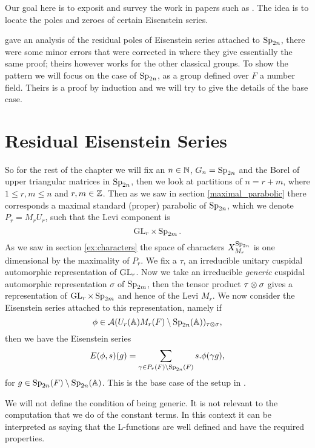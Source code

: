 \label{ch:jiang}
Our goal here is to exposit and survey the work in papers such as \cite{brennerNotesAnalyticProperties2009}\cite{jiangPolesCertainResidual2013}. The idea is to locate the poles and zeroes of certain Eisenstein series. 

\cite{brennerNotesAnalyticProperties2009} gave an analysis of the residual poles of Eisenstein series attached to \(\operatorname{Sp}_{2n}\), there were some minor errors that were corrected in \cite{jiangPolesCertainResidual2013} where they give essentially the same proof; theirs however works for the other classical groups. To show the pattern we will focus on the case of \(\operatorname{Sp}_{2n}\), as a group defined over \(F\) a number field. Theirs is a proof by induction and we will try to give the details of the base case. 

\section{Residual Eisenstein Series}
So for the rest of the chapter we will fix an \(n\in \N\), \(G_n = \operatorname{Sp}_{2n}\) and the Borel of upper triangular matrices in \(\operatorname{Sp}_{2n} \), then we look at partitions of \(n = r + m\), where \(1\leq r,m \leq n\) and \(r,m\in \Z\). Then as we saw in section \ref{maximal_parabolic} there corresponds a maximal standard (proper) parabolic of \(\operatorname{Sp}_{2n}\), which we denote \(P_r = M_rU_r\), such that the Levi component is 
\[\operatorname{GL}_r\times \operatorname{Sp}_{2m}. \]
As we saw in section \ref{ex:characters} the space of characters \(X^{\operatorname{Sp}_{2n}}_{M_r}\) is one dimensional by the maximality of \(P_r\). We fix a \(\tau\), an irreducible unitary cuspidal automorphic representation of \(\operatorname{GL}_r\). Now we take an irreducible \textit{generic} cuspidal automorphic representation \(\sigma\) of \(\operatorname{Sp}_{2m}\), then the tensor product \(\tau \otimes \sigma\) gives a representation of \(\operatorname{GL}_{r}\times \operatorname{Sp}_{2m}\) and hence of the Levi \(M_r\). We now consider the Eisenstein series attached to this representation, namely if 
\[\phi\in \mathcal{A}(U_r(\A)M_r(F)\setminus \Sp_{2n}(\A) )_{\tau\tensor \sigma},\] 
then we have the Eisenstein series
\[E(\phi, s)(g) = \sum_{\gamma\in P_r(F) \setminus \Sp_{2n}(F)} s.\phi(\gamma g),\]
for \(g\in \Sp_{2n}(F) \setminus \Sp_{2n}(\A)\). 
This is the base case of the setup in \cite{jiangPolesCertainResidual2013}.

\begin{remark}
	We will not define the condition of being generic. It is not relevant to the computation that we do of the constant terms. In this context it can be interpreted as saying that the L-functions are well defined and have the required properties.
\end{remark}


